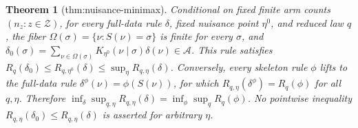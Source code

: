 \documentclass{article}
\newtheorem{theorem}{Theorem}
\begin{document}
\begin{theorem}[thm:nuisance-minimax]\label{thm:nuisance-minimax}
Conditional on fixed finite arm counts \((n_z:z\in\mathcal Z)\), for every full-data rule \(\delta\), fixed nuisance point \(\eta^0\), and reduced law \(q\), the fiber \(\Omega(\sigma)=\{\nu:S(\nu)=\sigma\}\) is finite for every \(\sigma\), and \(\delta_0(\sigma)=\sum_{\nu\in\Omega(\sigma)}K_{\eta^0}(\nu\mid\sigma)\delta(\nu)\in\mathcal A\). This rule satisfies \(R_q(\delta_0)\le R_{q,\eta^0}(\delta)\le\sup_\eta R_{q,\eta}(\delta)\). Conversely, every skeleton rule \(\phi\) lifts to the full-data rule \(\delta^{\phi}(\nu)=\phi(S(\nu))\), for which \(R_{q,\eta}(\delta^{\phi})=R_q(\phi)\) for all \(q,\eta\). Therefore \(\inf_\delta\sup_{q,\eta}R_{q,\eta}(\delta)=\inf_\phi\sup_qR_q(\phi)\). No pointwise inequality \(R_{q,\eta}(\delta_0)\le R_{q,\eta}(\delta)\) is asserted for arbitrary \(\eta\).
\end{theorem}
\end{document}
